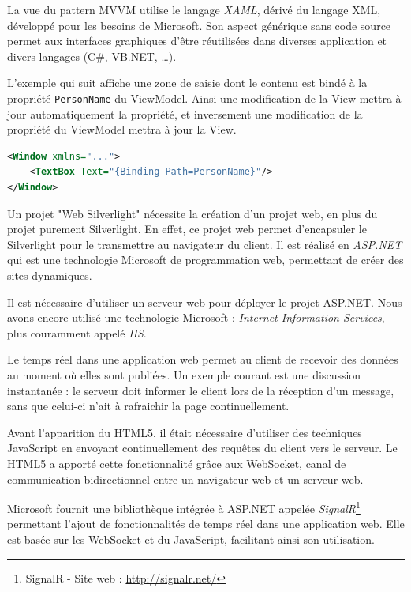 La vue du pattern MVVM utilise le langage \textit{XAML}, dérivé du langage XML, développé pour les besoins de Microsoft.
Son aspect générique sans code source permet aux interfaces graphiques d'être réutilisées dans diverses application et divers langages (C\#, VB.NET, \ldots).

L'exemple qui suit affiche une zone de saisie dont le contenu est bindé à la propriété \lstinline{PersonName} du ViewModel.
Ainsi une modification de la View mettra à jour automatiquement la propriété, et inversement une modification de la propriété du ViewModel mettra à jour la View.
\begin{lstlisting}[language = xml]
<Window xmlns="...">
	<TextBox Text="{Binding Path=PersonName}"/>
</Window>
\end{lstlisting}



Un projet "Web Silverlight" nécessite la création d'un projet web, en plus du projet purement Silverlight.
En effet, ce projet web permet d'encapsuler le Silverlight pour le transmettre au navigateur du client.
Il est réalisé en \textit{ASP.NET} qui est une technologie Microsoft de programmation web, permettant de créer des sites dynamiques.

Il est nécessaire d'utiliser un serveur web pour déployer le projet ASP.NET.
Nous avons encore utilisé une technologie Microsoft : \textit{Internet Information Services}, plus couramment appelé \textit{IIS}.



Le temps réel dans une application web permet au client de recevoir des données au moment où elles sont publiées.
Un exemple courant est une discussion instantanée : le serveur doit informer le client lors de la réception d'un message, sans que celui-ci n'ait à rafraichir la page continuellement.

Avant l'apparition du HTML5, il était nécessaire d'utiliser des techniques JavaScript en envoyant continuellement des requêtes du client vers le serveur.
Le HTML5 a apporté cette fonctionnalité grâce aux WebSocket, canal de communication bidirectionnel entre un navigateur web et un serveur web.

Microsoft fournit une bibliothèque intégrée à ASP.NET appelée \textit{SignalR}\footnote{SignalR - Site web : \url{http://signalr.net/}} permettant l'ajout de fonctionnalités de temps réel dans une application web.
Elle est basée sur les WebSocket et du JavaScript, facilitant ainsi son utilisation.

